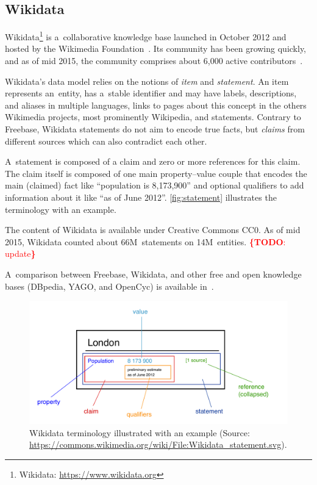 \documentclass{acm_proc_article-sp}
\newcommand{\todo}[1]{\noindent\textcolor{red}{{\bf \{TODO}: #1{\bf \}}}}
\begin{document}
\subsection{Wikidata}

Wikidata\footnote{Wikidata: \url{https://www.wikidata.org}}
is a~collaborative knowledge base
launched in October 2012 and hosted by the Wikimedia Foundation~\cite{vrandevcic2014wikidata}.
Its community has been growing quickly, and as of mid 2015,
the community comprises about 6,000 active contributors~\cite{wikidatastats}.

Wikidata's data model relies on the notions of \emph{item} and \emph{statement}.
An item represents an~entity, has a~stable identifier and may have labels,
descriptions, and aliases in multiple languages, links to pages about this concept
in the others Wikimedia projects, most prominently Wikipedia, and statements.
Contrary to Freebase, Wikidata statements do not aim to encode true facts,
but \emph{claims} from different sources which can also contradict each other.

A~statement is composed of a claim and zero or more references for this claim.
The claim itself is composed of one main property--value couple that encodes
the main (claimed) fact like ``population is 8,173,900'' and optional qualifiers
to add information about it like ``as of June 2012''.
\autoref{fig:statement} illustrates the terminology with an example.

The content of Wikidata is available under Creative Commons CC0.
As of mid 2015, Wikidata counted about 66M~statements on 14M~entities. \todo{update}

A~comparison between Freebase, Wikidata, and other free and open knowledge bases
(DBpedia, YAGO, and OpenCyc) is available in~\cite{farbercomparative}.

\begin{figure}[!htbp]
\centering
\includegraphics[width=8.45 cm]{img/Wikidata_statement.pdf}
\caption{Wikidata terminology illustrated with an example (Source:
	\url{https://commons.wikimedia.org/wiki/File:Wikidata_statement.svg}).}
\label{fig:statement}
\end{figure}
\end{document}
